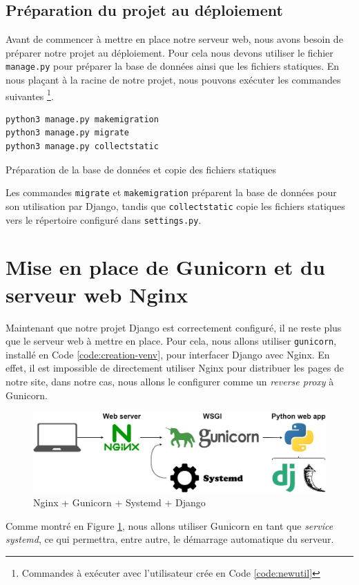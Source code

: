 \documentclass{article}
\begin{document}
        \subsection{Préparation du projet au déploiement}
        Avant de commencer à mettre en place notre serveur web, nous avons besoin de préparer notre projet au déploiement.
        Pour cela nous devons utiliser le fichier \verb|manage.py| pour préparer la base de données ainsi que les fichiers statiques. En nous plaçant à la racine de notre projet, nous pouvons exécuter les commandes suivantes
        \footnote{Commandes à exécuter avec l'utilisateur crée en Code \ref{code:newutil}}.
        \begin{listing}[H]
            \begin{verbatim}
python3 manage.py makemigration
python3 manage.py migrate
python3 manage.py collectstatic
            \end{verbatim}
            \caption{Préparation de la base de données et copie des fichiers statiques}
            \label{code:manage.py}
        \end{listing}
        Les commandes \verb|migrate| et \verb|makemigration| préparent la base de données pour son utilisation par Django, tandis que \verb|collectstatic| copie les fichiers statiques vers le répertoire configuré dans \verb|settings.py|.

\section{Mise en place de Gunicorn et du serveur web Nginx}
    Maintenant que notre projet Django est correctement configuré, il ne reste plus que le serveur web à mettre en place. Pour cela, nous allons utiliser \verb|gunicorn|, installé en Code \ref{code:creation-venv}, pour interfacer Django avec Nginx.
    En effet, il est impossible de directement utiliser Nginx pour distribuer les pages de notre site, dans notre cas, nous allons le configurer comme un \emph{reverse proxy} à Gunicorn.
    \begin{figure}[H]
        \includegraphics[width=\linewidth]{fig/gunicorn.jpeg}
        \caption{Nginx + Gunicorn + Systemd + Django}
        \label{fig:gunicorn}
    \end{figure}
    Comme montré en Figure \ref{fig:gunicorn}, nous allons utiliser Gunicorn en tant que \emph{service systemd}, ce qui permettra, entre autre, le démarrage automatique du serveur.
\end{document}
